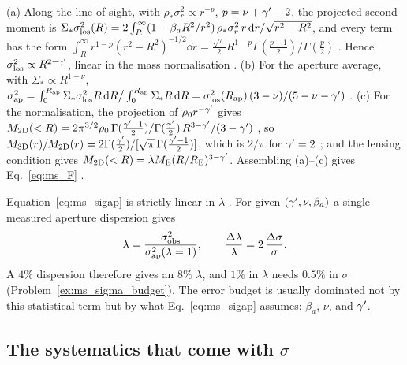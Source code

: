 \begin{derivation}
(a) Along the line of sight, with $\rho_\ast\sigma_r^2\propto r^{-p}$,
$p=\nu+\gamma'-2$, the projected second moment is
$\Sigma_\ast\sigma_{\rm los}^2(R)=2\int_R^\infty(1-\beta_aR^2/r^2)\,\rho_\ast\sigma_r^2\,r\,\dd r/\sqrt{r^2-R^2}$,
and every term has the form
$\int_R^\infty r^{1-p}(r^2-R^2)^{-1/2}\dd r=\tfrac{\sqrt\pi}{2}R^{1-p}\Gamma(\tfrac{p-1}{2})/\Gamma(\tfrac p2)$
.  Hence
$\sigma_{\rm los}^2\propto R^{2-\gamma'}$, linear in the mass normalisation
.
(b) For the aperture average, with $\Sigma_\ast\propto R^{1-\nu}$,
$\sigma_{\rm ap}^2=\int_0^{R_{\rm ap}}\Sigma_\ast\sigma_{\rm los}^2R\,\dd R\big/\int_0^{R_{\rm ap}}\Sigma_\ast R\,\dd R
=\sigma_{\rm los}^2(R_{\rm ap})\,(3-\nu)/(5-\nu-\gamma')$ .
(c) For the normalisation, the projection of $\rho_0r^{-\gamma'}$ gives
$M_{\rm 2D}(<R)=2\pi^{3/2}\rho_0\,\Gamma(\tfrac{\gamma'-1}{2})/\Gamma(\tfrac{\gamma'}{2})\,R^{3-\gamma'}/(3-\gamma')$
, so $M_{\rm 3D}(r)/M_{\rm 2D}(r)=2\Gamma(\tfrac{\gamma'}{2})/[\sqrt\pi\,\Gamma(\tfrac{\gamma'-1}{2})]$,
which is $2/\pi$ for $\gamma'=2$ ; and the lensing condition gives
$M_{\rm 2D}(<R)=\lambda M_{\rm E}(R/R_{\rm E})^{3-\gamma'}$.
Assembling (a)--(c) gives Eq.~\eqref{eq:ms_F} .
\end{derivation}

\begin{keybox}
Equation~\eqref{eq:ms_sigap} is strictly linear in $\lambda$ .  For
given $(\gamma',\nu,\beta_a)$ a single measured aperture dispersion gives
\begin{equation}
    \lambda=\frac{\sigma_{\rm obs}^2}{\sigma_{\rm ap}^2(\lambda=1)},
    \qquad
    \frac{\Delta\lambda}{\lambda}=2\,\frac{\Delta\sigma}{\sigma}.
    \label{eq:ms_lambda_sigma}
\end{equation}
A $4\%$ dispersion therefore gives an $8\%$ $\lambda$, and $1\%$ in $\lambda$
needs $0.5\%$ in $\sigma$ (Problem~\ref{ex:ms_sigma_budget}).  The error
budget is usually dominated not by this statistical term but by what
Eq.~\eqref{eq:ms_sigap} assumes: $\beta_a$, $\nu$, and $\gamma'$.
\end{keybox}

\subsection{The systematics that come with $\sigma$}
\label{sec:ms_kin_sys}

